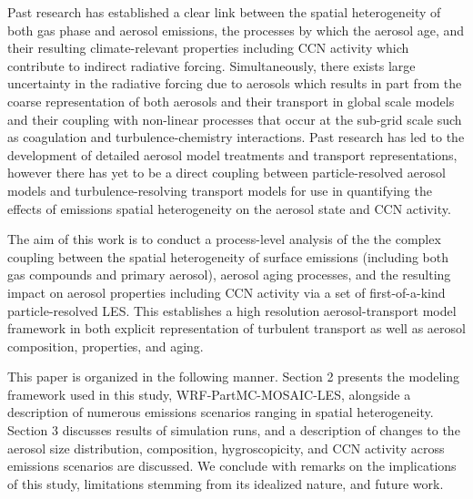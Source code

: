 \documentclass[journal abbreviation, manuscript]{copernicus}
\begin{document}

Past research has established a clear link between the spatial heterogeneity of both gas phase and aerosol emissions, the processes by which the aerosol age, and their resulting climate-relevant properties including CCN activity which contribute to indirect radiative forcing. Simultaneously, there exists large uncertainty in the radiative forcing due to aerosols which results in part from the coarse representation of both aerosols and their transport in global scale models and their coupling with non-linear processes that occur at the sub-grid scale such as coagulation and turbulence-chemistry interactions. Past research has led to the development of detailed aerosol model treatments and transport representations, however there has yet to be a direct coupling between particle-resolved aerosol models and turbulence-resolving transport models for use in quantifying the effects of emissions spatial heterogeneity on the aerosol state and CCN activity.

The aim of this work is to conduct a process-level analysis of the the complex coupling between the spatial heterogeneity of surface emissions (including both gas compounds and primary aerosol), aerosol aging processes, and the resulting impact on aerosol properties including CCN activity via a set of first-of-a-kind particle-resolved LES. This establishes a high resolution aerosol-transport model framework in both explicit representation of turbulent transport as well as aerosol composition, properties, and aging.

This paper is organized in the following manner. Section 2 presents the modeling framework used in this study, WRF-PartMC-MOSAIC-LES, alongside a description of numerous emissions scenarios ranging in spatial heterogeneity. Section 3 discusses results of simulation runs, and a description of changes to the aerosol size distribution, composition, hygroscopicity, and CCN activity across emissions scenarios are discussed. We conclude with remarks on the implications of this study, limitations stemming from its idealized nature, and future work. 
\end{document}
